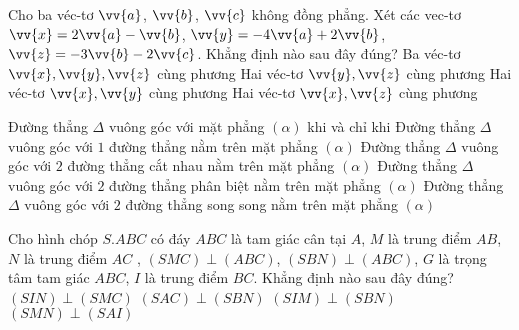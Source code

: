\begin{ex}%
	Cho ba véc-tơ $\vv{a}$, $\vv{b}$, $\vv{c}$ không đồng phẳng. Xét các vec-tơ $\vv{x}= 2 \vv{a}-\vv{b}$, $\vv{y}=-4\vv{a}+2\vv{b}$, $\vv{z} = -3 \vv{b}-2\vv{c}$. Khẳng định nào sau đây đúng?
	\choice
	{Ba véc-tơ $\vv{x}, \vv{y}, \vv{z}$ cùng phương}
	{Hai véc-tơ $ \vv{y}, \vv{z}$ cùng phương}
	{\True Hai véc-tơ $ \vv{x}, \vv{y}$ cùng phương}
	{Hai véc-tơ $\vv{x}, \vv{z}$ cùng phương}
\end{ex}

\begin{ex}%
	Đường thẳng $\Delta$ vuông góc với mặt phẳng $(\alpha)$ khi và chỉ khi
	\choice
	{Đường thẳng $\Delta$ vuông góc với $1$ đường thẳng nằm trên mặt phẳng $(\alpha)$}
	{\True Đường thẳng $\Delta$ vuông góc với $2$ đường thẳng cắt nhau nằm trên mặt phẳng $(\alpha)$}
	{Đường thẳng $\Delta$ vuông góc với $2$ đường thẳng phân biệt nằm trên mặt phẳng $(\alpha)$}
	{Đường thẳng $\Delta$ vuông góc với $2$ đường thẳng song song nằm trên mặt phẳng $(\alpha)$}
\end{ex}

\begin{ex}%
	Cho hình chóp $S.ABC$ có đáy $ABC$ là tam giác cân tại $A$, $M$ là trung điểm $AB$, $N$ là trung điểm $AC$ , $(SMC) \perp (ABC)$, $(SBN) \perp (ABC)$, $G$ là trọng tâm tam giác $ABC$, $I$ là trung điểm $BC$. Khẳng định nào sau đây đúng?
	\choice
	{$(SIN) \perp (SMC)$}
	{$(SAC) \perp (SBN)$}
	{$(SIM) \perp (SBN)$}
	{\True $(SMN) \perp (SAI)$}
\end{ex}


